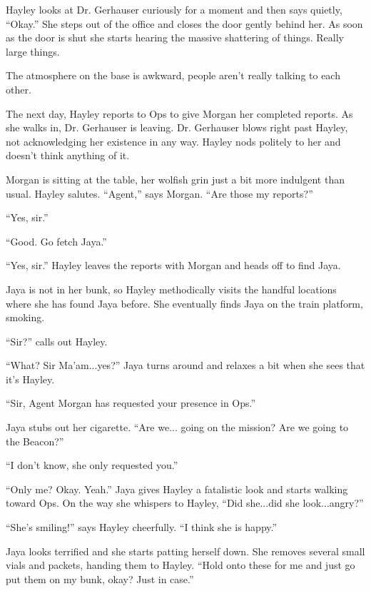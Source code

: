 Hayley looks at Dr. Gerhauser curiously for a moment and then says quietly, ``Okay.''  She steps out of the office and closes the door gently behind her.  As soon as the door is shut she starts hearing the massive shattering of things.  Really large things.





The atmosphere on the base is awkward, people aren't really talking to each other.   



The next day, Hayley reports to Ops to give Morgan her completed reports.  As she walks in, Dr. Gerhauser is leaving.  Dr. Gerhauser blows right past Hayley, not acknowledging her existence in any way.  Hayley nods politely to her and doesn't think anything of it.



Morgan is sitting at the table, her wolfish grin just a bit more indulgent than usual.  Hayley salutes.  ``Agent,'' says Morgan.  ``Are those my reports?''

``Yes, sir.''

``Good. Go fetch Jaya.''

``Yes, sir.''  Hayley leaves the reports with Morgan and heads off to find Jaya.



Jaya is not in her bunk, so Hayley methodically visits the handful locations where she has found Jaya before.  She eventually finds Jaya on the train platform, smoking.

``Sir?'' calls out Hayley.

``What? Sir Ma'am...yes?'' Jaya turns around and relaxes a bit when she sees that it's Hayley.

``Sir, Agent Morgan has requested your presence in Ops.''

Jaya stubs out her cigarette.  ``Are we... going on the mission?  Are we going to the Beacon?''

``I don't know, she only requested you.''

``Only me?  Okay.  Yeah.''  Jaya gives Hayley a fatalistic look and starts walking toward Ops.  On the way she whispers to Hayley, ``Did she...did she look...angry?''

``She's smiling!'' says Hayley cheerfully.  ``I think she is happy.''

Jaya looks terrified and she starts patting herself down.  She removes several small vials and packets, handing them to Hayley.  ``Hold onto these for me and just go put them on my bunk, okay?  Just in case.''

